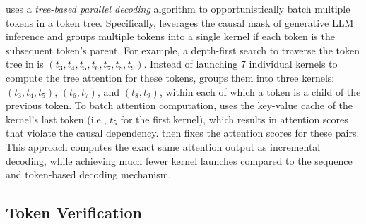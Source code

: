 \Sys uses a {\em tree-based parallel decoding} algorithm to opportunistically batch multiple tokens in a token tree. Specifically, \Sys leverages the causal mask of generative LLM inference and groups multiple tokens into a single kernel if each token is the subsequent token's parent.
For example, a depth-first search to traverse the token tree in  is $(t_3, t_4, t_5, t_6, t_7, t_8, t_9)$. Instead of launching 7 individual kernels to compute the tree attention for these tokens, \Sys groups them into three kernels: $(t_3, t_4, t_5)$, $(t_6, t_7)$, and $(t_8, t_9)$, within each of which a token is a child of the previous token.
To batch attention computation, \Sys uses the key-value cache of the kernel's last token (i.e., $t_5$ for the first kernel), which results in attention scores that violate the causal dependency. \Sys then fixes the attention scores for these pairs.
This approach computes the exact same attention output as incremental decoding, while achieving much fewer kernel launches compared to the sequence and token-based decoding mechanism.
\fi 



\subsection{Token Verification}
\label{subsec:verification}

